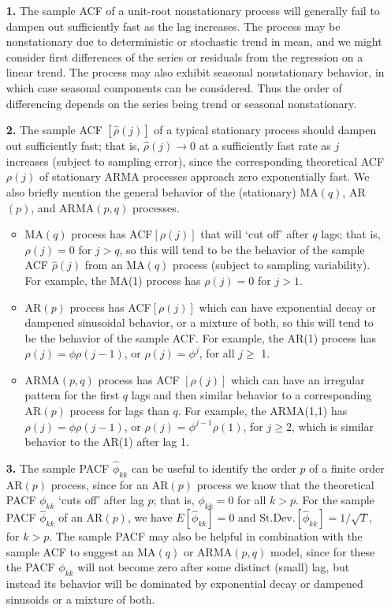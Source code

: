 \begin{enumerate}
\item[\textbf{1.}] The sample ACF of a unit-root nonstationary process will generally fail to dampen out sufficiently fast as the lag increases. The process may be nonstationary due to deterministic or stochastic trend in mean, and we might consider first differences of the series or residuals from the regression on a linear trend. The process may also exhibit seasonal nonstationary behavior, in which case seasonal components can be considered. Thus the order of differencing depends on the series being trend or seasonal nonstationary.

\item[\textbf{2.}] The sample ACF $[\hat{\rho}(j)]$ of a typical stationary process should dampen out sufficiently fast; that is, $\hat{\rho}(j) \rightarrow 0$ at a sufficiently fast rate as $j$ increases (subject to sampling error), since the corresponding theoretical ACF $\rho(j)$ of stationary ARMA processes approach zero exponentially fast. We also briefly mention the general behavior of the (stationary) MA$(q)$, AR$(p)$, and ARMA$(p,q)$ processes.

\begin{itemize}
\item MA$(q)$ process has ACF$[\rho(j)]$ that will `cut off' after $q$ lags; that is, $\rho(j) = 0$ for $j>q$, so this will tend to be the behavior of the sample ACF $\hat{\rho}(j)$ from an MA$(q)$ process (subject to sampling variability). For example, the MA(1) process has $\rho(j)=0$ for $j>1$.

\item AR$(p)$ process has ACF$[\rho(j)]$ which can have exponential decay or dampened sinusoidal behavior, or a mixture of both, so this will tend to be the behavior of the sample ACF. For example, the AR(1) process has $\rho(j)=\phi \rho(j-1)$,  or $\rho(j) = \phi^j$, for all $j \geq$ 1.

\item ARMA$(p,q)$ process has ACF $[\rho(j)]$ which can have an irregular pattern for the first $q$ lags and then similar behavior to a corresponding AR$(p)$ process for lags than $q$. For example, the ARMA(1,1) has $\rho(j) = \phi\rho(j-1)$, or $\rho(j)=\phi^{j-1}\rho(1)$, for $j \geq 2$, which is similar behavior to the AR(1) after lag 1.
\end{itemize}

\item[\textbf{3.}] The sample PACF $\hat{\phi}_{kk}$ can be useful to identify the order $p$ of a finite order AR$(p)$ process, since for an AR$(p)$ process we know that the theoretical PACF $\phi_{kk}$ `cuts off' after lag $p$; that is, $\phi_{kk}=0$ for all $k>p$. For the sample PACF $\hat{\phi}_{kk}$ of an AR$(p)$, we have $E[\hat{\phi}_{kk}]=0$ and $\text{St.Dev.}[\hat{\phi}_{kk}]=1/\sqrt{T}$, for $k>p$. The sample PACF may also be helpful in combination with the sample ACF to suggest an MA$(q)$ or ARMA$(p,q)$ model, since for these the PACF $\phi_{kk}$ will not become zero after some distinct (small) lag, but instead its behavior will be dominated by exponential decay or dampened sinusoids or a mixture of both.
\end{enumerate}


